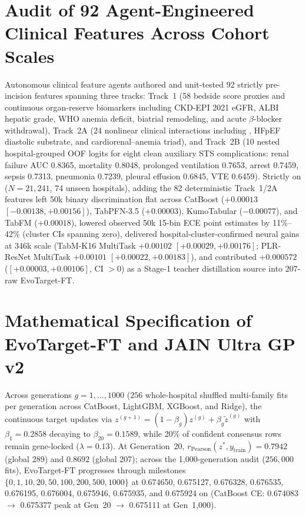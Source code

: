 \section{Audit of 92 Agent-Engineered Clinical Features Across Cohort Scales}
\label{supp:agentic_fe}
Autonomous clinical feature agents authored and unit-tested 92 strictly pre-incision features spanning three tracks: Track~1 (58 bedside score proxies and continuous organ-reserve biomarkers including CKD-EPI 2021 eGFR,\cite{inker2021ckdepi} ALBI hepatic grade,\cite{johnson2015albi} WHO anemia deficit, biatrial remodeling, and acute $\beta$-blocker withdrawal), Track~2A (24 nonlinear clinical interactions including , HFpEF diastolic substrate, and cardiorenal--anemia triad), and Track~2B (10 nested hospital-grouped OOF logits for eight clean auxiliary STS complications: renal failure AUC 0.8365, mortality 0.8048, prolonged ventilation 0.7653, arrest 0.7459, sepsis 0.7313, pneumonia 0.7239, pleural effusion 0.6845, VTE 0.6459). Strictly on  ($N=21{,}241$, 74 unseen hospitals), adding the 82 deterministic Track~1/2A features left 50k binary discrimination flat across CatBoost ($+0.00013$ $[-0.00138, +0.00156]$), TabPFN-3.5 ($+0.00003$), KumoTabular ($-0.00077$), and TabFM ($+0.00018$), lowered observed 50k 15-bin ECE point estimates by 11\%--42\% (cluster CIs spanning zero), delivered hospital-cluster-confirmed neural gains at 346k scale (TabM-K16 MultiTask\cite{gorishniy2025tabm} $+0.00102$ $[+0.00029, +0.00176]$; PLR-ResNet MultiTask $+0.00101$ $[+0.00022, +0.00183]$), and contributed $+0.000572$ ($[+0.00003, +0.00106]$, CI $>0$) as a Stage-1 teacher distillation source into 207-raw EvoTarget-FT.

\section{Mathematical Specification of EvoTarget-FT and JAIN Ultra GP v2}
\label{supp:math}
Across generations $g = 1,\dots,1000$ ($256$ whole-hospital shuffled multi-family fits per generation across CatBoost, LightGBM, XGBoost, and Ridge), the continuous target updates via $z^{(g+1)} = (1-\beta_g)z^{(g)} + \beta_g\tilde{z}^{(g)}$ with $\beta_1 = 0.2858$ decaying to $\beta_{20} = 0.1589$, while 20\% of confident consensus rows remain gene-locked ($\lambda = 0.13$). At Generation~20, $r_{\mathrm{Pearson}}(z^*, y_{\mathrm{train}}) = 0.7942$ (global 289) and $0.8692$ (global 207); across the 1,000-generation audit ($256{,}000$ fits), EvoTarget-FT progresses through milestones $\{0,1,10,20,50,100,200,500,1000\}$ at 0.674650, 0.675127, 0.676328, 0.676535, 0.676195, 0.676004, 0.675946, 0.675935, and 0.675924 on  (CatBoost CE: 0.674083 $\to$ 0.675377 peak at Gen~20 $\to$ 0.675111 at Gen~1,000).

